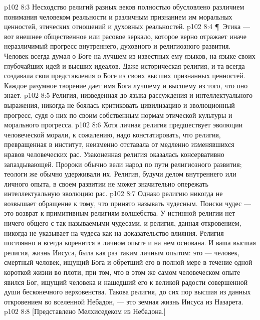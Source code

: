 \vs p102 8:3 Несходство религий разных веков полностью обусловлено различием понимания человеком реальности и различным признанием им моральных ценностей, этических отношений и духовных реальностей.
\vs p102 8:4 \P\ Этика --- вот внешнее общественное или расовое зеркало, которое верно отражает иначе неразличимый прогресс внутреннего, духовного и религиозного развития. Человек всегда думал о Боге на лучшем из известных ему языков, на языке своих глубочайших идей и высших идеалов. Даже историческая религия, и та всегда создавала свои представления о Боге из своих высших признанных ценностей. Каждое разумное творение дает имя Бога лучшему и высшему из того, что оно знает.
\vs p102 8:5 Религия, низведенная до языка рассуждения и интеллектуального выражения, никогда не боялась критиковать цивилизацию и эволюционный прогресс, судя о них по своим собственным нормам этической культуры и морального прогресса.
\vs p102 8:6 Хотя личная религия предшествует эволюции человеческой морали, к сожалению, надо констатировать, что религия, превращенная в институт, неизменно отставала от медленно изменявшихся нравов человеческих рас. Узаконенная религия оказалась консервативно запаздывающей. Пророки обычно вели народ по пути религиозного развития; теологи же обычно удерживали их. Религия, будучи делом внутреннего или личного опыта, в своем развитии не может значительно опережать интеллектуальную эволюцию рас.
\vs p102 8:7 Однако религию никогда не возвышает обращение к тому, что принято называть чудесным. Поиски чудес --- это возврат к примитивным религиям волшебства. У истинной религии нет ничего общего с так называемыми чудесами, и религия, данная откровением, никогда не указывает на чудеса как на доказательство влияния. Религия постоянно и всегда коренится в личном опыте и на нем основана. И ваша высшая религия, жизнь Иисуса, была как раз таким личным опытом: это --- человек, смертный человек, ищущий Бога и обретший его в полной мере в течение одной короткой жизни во плоти, при том, что в этом же самом человеческом опыте явился Бог, ищущий человека и нашедший его к великой радости совершенной души бесконечного верховенства. Такова религия, до сих пор высшая из данных откровением во вселенной Небадон, --- это земная жизнь Иисуса из Назарета.
\vs p102 8:8 [Представлено Мелхиседеком из Небадона.]
